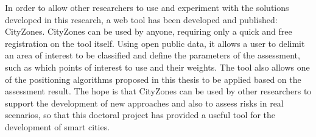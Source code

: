 
In order to allow other researchers to use and experiment with the solutions developed in this research, a web tool has been developed and published: CityZones. CityZones can be used by anyone, requiring only a quick and free registration on the tool itself. Using open public data, it allows a user to delimit an area of interest to be classified and define the parameters of the assessment, such as which points of interest to use and their weights. The tool also allows one of the positioning algorithms proposed in this thesis to be applied based on the assessment result. The hope is that CityZones can be used by other researchers to support the development of new approaches and also to assess risks in real scenarios, so that this doctoral project has provided a useful tool for the development of smart cities.


